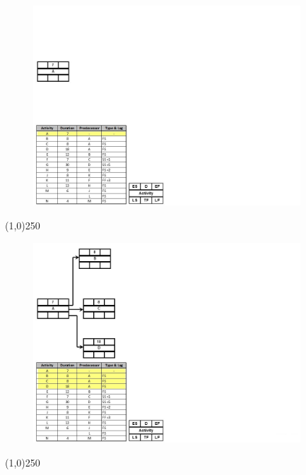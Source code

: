 \begin{frame}
\begin{figure}
	\centering
		\includegraphics[width = 10.0cm]{oldnotes/Slide190.jpg}
\end{figure}
\end{frame}
\begin{center}\line(1,0){250}\end{center}




\begin{frame}
\begin{figure}
	\centering
		\includegraphics[width = 10.0cm]{oldnotes/Slide191.jpg}
\end{figure}
\end{frame}
\begin{center}\line(1,0){250}\end{center}




